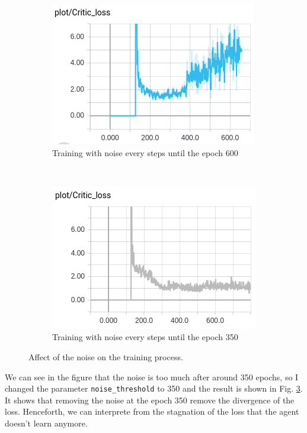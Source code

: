\documentclass{article}
\begin{document}
\begin{figure}[ht]
  \begin{subfigure}[t]{.5\textwidth}
    \centering
    \includegraphics[width=1.\textwidth]{plot_noise_600}
    \caption{Training with noise every steps until the epoch 600}
    \label{fig:noise_600}
  \end{subfigure}%
  ~
  \begin{subfigure}[t]{.5\textwidth}
    \centering
    \includegraphics[width=1.\textwidth]{plot_noise_350}
    \caption{Training with noise every steps until the epoch 350}
    \label{fig:noise_350}
  \end{subfigure}
  \caption{Affect of the noise on the training process.}
\end{figure}

We can see in the figure that the noise is too much after around 350 epochs, so I changed
the parameter \verb?noise_threshold? to 350 and the result is shown in Fig. \ref{fig:noise_350}.
It shows that removing the noise at the epoch 350 remove the divergence of the loss. Henceforth,
we can interprete from the stagnation of the loss that the agent doesn't learn anymore.
\end{document}
